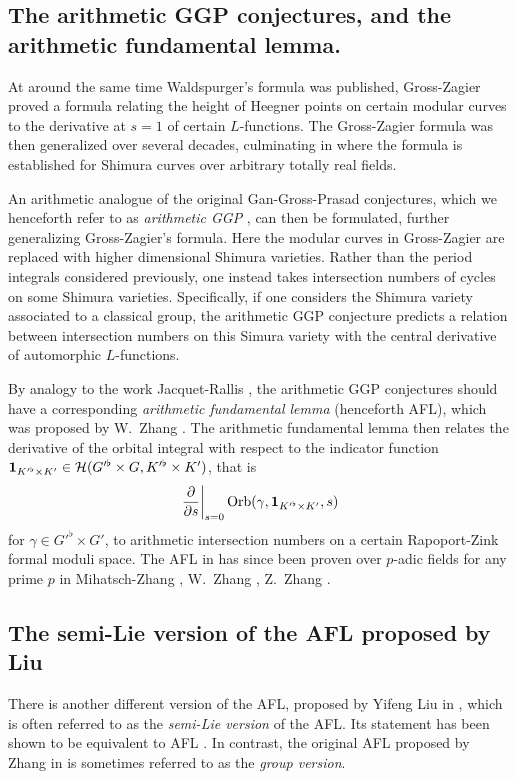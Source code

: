 \subsection{The arithmetic GGP conjectures, and the arithmetic fundamental lemma.}
At around the same time Waldspurger's formula was published,
Gross-Zagier \cite{ref:gross_zagier} proved a formula
relating the height of Heegner points
on certain modular curves to the derivative at $s=1$ of certain $L$-functions.
The Gross-Zagier formula was then generalized over several decades,
culminating in \cite{ref:GZshimura} where the formula is established
for Shimura curves over arbitrary totally real fields.

An arithmetic analogue of the original Gan-Gross-Prasad conjectures,
which we henceforth refer to as \emph{arithmetic GGP} \cite{ref:GGP},
can then be formulated, further generalizing Gross-Zagier's formula.
Here the modular curves in Gross-Zagier
are replaced with higher dimensional Shimura varieties.
Rather than the period integrals considered previously,
one instead takes intersection numbers of cycles on some Shimura varieties.
Specifically, if one considers the Shimura variety associated to a classical group,
the arithmetic GGP conjecture predicts a relation between intersection numbers
on this Simura variety with the central derivative of automorphic $L$-functions.

By analogy to the work Jacquet-Rallis \cite{ref:JR},
the arithmetic GGP conjectures should have a corresponding
\emph{arithmetic fundamental lemma} (henceforth AFL),
which was proposed by W.\ Zhang \cite[Conjecture 2.9]{ref:AFL}.
The arithmetic fundamental lemma then relates the derivative
of the orbital integral with respect to the indicator function
$\mathbf{1}_{K'^\flat \times K'} \in \mathcal H(G'^\flat \times G, K'^\flat \times K')$, that is
\[ \left. \pdv{}{s} \right\rvert_{s=0} \operatorname{Orb}(\gamma, \mathbf{1}_{K'^\flat \times K'}, s) \]
for $\gamma \in G'^\flat \times G'$,
to arithmetic intersection numbers on a certain Rapoport-Zink formal moduli space.
The AFL in \cite{ref:AFL} has since been proven over $p$-adic fields for any prime $p$ in
Mihatsch-Zhang \cite{ref:MZ2021}, W.\ Zhang \cite{ref:Wei2021}, Z.\ Zhang \cite{ref:Zhiyu}.

\subsection{The semi-Lie version of the AFL proposed by Liu}
There is another different version of the AFL, proposed by Yifeng Liu in
\cite[Conjecture 1.12]{ref:liuFJ},
which is often referred to as the \emph{semi-Lie version} of the AFL.
Its statement has been shown to be equivalent to AFL
\cite[Remark 1.13]{ref:liuFJ}.
In contrast, the original AFL proposed by Zhang in \cite[Conjecture 2.9]{ref:AFL}
is sometimes referred to as the \emph{group version}.

